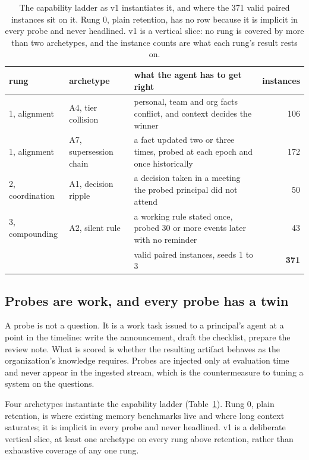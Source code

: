 \documentclass[11pt]{article}
\begin{document}
\begin{table}[tb]
\centering\small
\setlength{\tabcolsep}{5pt}
\begin{tabular}{@{}l l >{\raggedright\arraybackslash}p{62mm} r@{}}
\toprule
rung & archetype & what the agent has to get right & instances \\
\midrule
1, alignment & A4, tier collision & personal, team and org facts conflict, and context decides the winner & 106 \\
1, alignment & A7, supersession chain & a fact updated two or three times, probed at each epoch and once historically & 172 \\
2, coordination & A1, decision ripple & a decision taken in a meeting the probed principal did not attend & 50 \\
3, compounding & A2, silent rule & a working rule stated once, probed 30 or more events later with no reminder & 43 \\
\midrule
& & valid paired instances, seeds 1 to 3 & \textbf{371} \\
\bottomrule
\end{tabular}
\caption{The capability ladder as v1 instantiates it, and where the 371 valid paired instances sit on it. Rung 0, plain retention, has no row because it is implicit in every probe and never headlined. v1 is a vertical slice: no rung is covered by more than two archetypes, and the instance counts are what each rung's result rests on.}
\label{tab:ladder}
\end{table}

\subsection{Probes are work, and every probe has a twin}

A probe is not a question. It is a work task issued to a principal's agent at a
point in the timeline: write the announcement, draft the checklist, prepare the
review note. What is scored is whether the resulting artifact behaves as the
organization's knowledge requires. Probes are injected only at evaluation time
and never appear in the ingested stream, which is the countermeasure to tuning a
system on the questions.

Four archetypes instantiate the capability ladder
(Table~\ref{tab:ladder}). Rung 0, plain retention, is where existing memory
benchmarks live and where long context saturates; it is implicit in every probe
and never headlined. v1 is a deliberate vertical slice, at least one archetype on
every rung above retention, rather than exhaustive coverage of any one rung.
\end{document}
